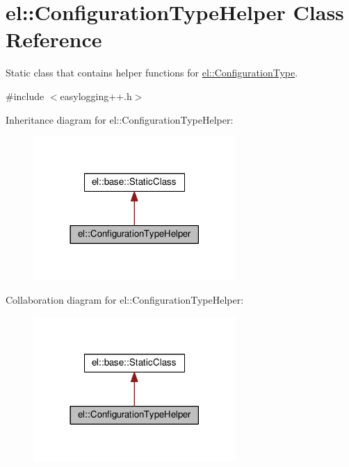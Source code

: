 \hypertarget{classel_1_1_configuration_type_helper}{}\section{el\+:\+:Configuration\+Type\+Helper Class Reference}
\label{classel_1_1_configuration_type_helper}


Static class that contains helper functions for \hyperlink{namespaceel_a281f5db6d6163678bc68a8b23b59e124}{el\+::\+Configuration\+Type}.  




{\ttfamily \#include $<$easylogging++.\+h$>$}



Inheritance diagram for el\+:\+:Configuration\+Type\+Helper\+:
\nopagebreak
\begin{figure}[H]
\begin{center}
\leavevmode
\includegraphics[width=218pt]{classel_1_1_configuration_type_helper__inherit__graph}
\end{center}
\end{figure}


Collaboration diagram for el\+:\+:Configuration\+Type\+Helper\+:
\nopagebreak
\begin{figure}[H]
\begin{center}
\leavevmode
\includegraphics[width=218pt]{classel_1_1_configuration_type_helper__coll__graph}
\end{center}
\end{figure}
